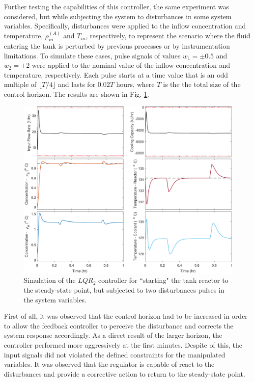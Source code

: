 \documentclass[a4paper,11pt]{book}
\numberwithin{figure}{chapter}
\numberwithin{equation}{chapter}
\numberwithin{table}{chapter}
\theoremstyle{definition}
\begin{document}
Further testing the capabilities of this controller, the same experiment was considered, but while subjecting the system to disturbances in some system variables. Specifically, disturbances were applied to the inflow concentration and temperature, $\rho^{(A)}_{in}$ and $T_{in}$, respectively, to represent the scenario where the fluid entering the tank is perturbed by previous processes or by instrumentation limitations. To simulate these cases, pulse signals of values $w_1 = \pm 0.5$ and $w_2 = \pm 2$ were applied to the nominal value of the inflow concentration and temperature, respectively. Each pulse starts at a time value that is an odd multiple of $\lfloor T/4 \rfloor$ and lasts for $0.02T$ hours, where $T$ is the the total size of the control horizon. The results are shown in Fig. \ref{fig:lqr02}.

\begin{figure}[ht] \centering
	\includegraphics[width=\textwidth]{chapter7/lqr02}
	
	\caption{Simulation of the $LQR_2$ controller for ``starting" the tank reactor to the steady-state point, but subjected to two disturbances pulses in the system variables. }
	\label{fig:lqr02}
\end{figure}	

First of all, it was observed that the control horizon had to be increased in order to allow the feedback controller to perceive the disturbance and corrects the system response accordingly. As a direct result of the larger horizon, the controller performed more aggressively at the first minutes. Despite of this, the input signals did not violated the defined constraints for the manipulated variables. It was observed that the regulator is capable of react to the disturbances and provide a corrective action to return to the steady-state point. 
\end{document}
